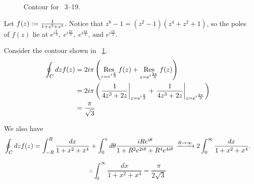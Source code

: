 \item

\begin{figure}[h]
	\centering
	\caption{Contour for ~3--19.}%
	\label{fig:problem3-19}
\end{figure}

Let $f(z) := \frac{1}{1 + z^2 + z^4}$.
Notice that $z^6 - 1 = \left( z^2 - 1 \right) \left( z^4 + z^2 + 1 \right)$,
so the poles of $f(z)$ lie at
$e^{i\frac{\pi}{3}},\; e^{i\frac{2\pi}{3}},\; e^{i\frac{4\pi}{3}} \text{, and } e^{i\frac{5\pi}{3}}$.

Consider the contour shown in ~\ref{fig:problem3-19}.
\begin{align*}
	\oint_C dz f(z)
	&= 2i\pi \left( \mathop{\mathrm{Res}}_{z=e^{i\frac{\pi}{3}}} f(z) + \mathop{\mathrm{Res}}_{z=e^{i\frac{2\pi}{3}}} f(z) \right) \\
	&= 2i\pi \left( {\left. \frac{1}{4z^3 + 2z} \right|}_{z=e^{i\frac{\pi}{3}}} + {\left. \frac{1}{4z^3 + 2z} \right|}_{z=e^{i\frac{2\pi}{3}}} \right) \\
	&= \frac{\pi}{\sqrt{3}}
\end{align*}

We also have
\[
    \oint_C dz f(z)
    = \int_{-R}^R \frac{dx}{1 + x^2 + x^4}
     + \int_0^\pi d\theta \frac{iRe^{i\theta}}{1 + R^2 e^{2i\theta} + R^4 e^{4i\theta}} \\
    \xrightarrow{R \rightarrow \infty}
     2\int_0^\infty \frac{dx}{1 + x^2 + x^4}.
\]

\[
    \therefore \int_0^\infty \frac{dx}{1 + x^2 + x^4} = \frac{\pi}{2\sqrt{3}}
\]
